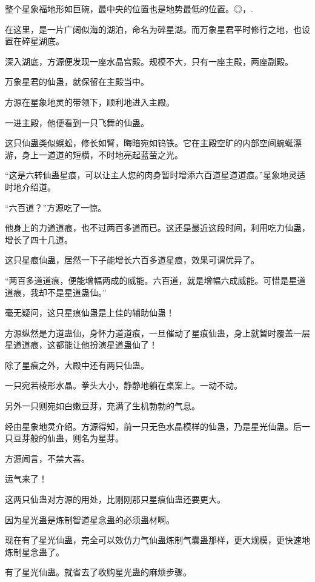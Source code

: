 
\begin{this_body}

整个星象福地形如巨碗，最中央的位置也是地势最低的位置。◎，.

在这里，是一片广阔似海的湖泊，命名为碎星湖。而万象星君平时修行之地，也设置在碎星湖底。

深入湖底，方源便发现一座水晶宫殿。规模不大，只有一座主殿，两座副殿。

万象星君的仙蛊，就保留在主殿当中。

方源在星象地灵的带领下，顺利地进入主殿。

一进主殿，他便看到一只飞舞的仙蛊。

这只仙蛊类似蜈蚣，修长如臂，晦暗宛如钨铁。它在主殿空旷的内部空间蜿蜒漂游，身上一道道的短横，不时地亮起蓝萤之光。

“这是六转仙蛊星痕，可以让主人您的肉身暂时增添六百道星道道痕。”星象地灵适时地介绍道。

“六百道？”方源吃了一惊。

他身上的力道道痕，也不过两百多道而已。这还是最近这段时间，利用吃力仙蛊，增长了四十几道。

这只星痕仙蛊，居然一下子能增长六百多道星痕，效果可谓优异了。

“两百多道道痕，便能增幅两成的威能。六百道，就是增幅六成威能。可惜是星道道痕，我却不是星道蛊仙。”

毫无疑问，这只星痕仙蛊是上佳的辅助仙蛊！

方源纵然是力道蛊仙，身怀力道道痕，一旦催动了星痕仙蛊，身上就暂时覆盖一层星道道痕，这都能让他扮演星道蛊仙了！

除了星痕之外，大殿中还有两只仙蛊。

一只宛若棱形水晶。拳头大小，静静地躺在桌案上。一动不动。

另外一只则宛如白嫩豆芽，充满了生机勃勃的气息。

经由星象地灵介绍。方源得知，前一只无色水晶模样的仙蛊，乃是星光仙蛊。后一只豆芽般的仙蛊，则名为星芽。

方源闻言，不禁大喜。

运气来了！

这两只仙蛊对方源的用处，比刚刚那只星痕仙蛊还要更大。

因为星光蛊是炼制智道星念蛊的必须蛊材啊。

现在有了星光仙蛊，完全可以效仿力气仙蛊炼制气囊蛊那样，更大规模，更快速地炼制星念蛊了。

有了星光仙蛊。就省去了收购星光蛊的麻烦步骤。


\end{this_body}
